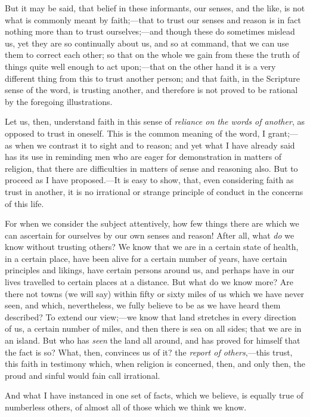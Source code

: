 But it may be said, that belief in these informants,
our senses, and the like, is not what is commonly meant
by faith;—that to trust our senses and reason is in
fact nothing more than to trust ourselves;—and
though these do sometimes mislead us, yet they are so
continually about us, and so at command, that we can use them to correct each other; so that on the whole we gain
from these the truth of things quite well enough to act
upon;—that on the other hand it is a very different
thing from this to trust another person; and that faith,
in the Scripture sense of the word, is trusting another,
and therefore is not proved to be rational by the
foregoing illustrations.

Let us, then, understand faith in this sense of \emph{reliance
on the words of another}, as opposed to trust in
oneself. This is the common meaning of the word, I
grant;—as when we contrast it to sight and to
reason; and yet what I have already said has its use in
reminding men who are eager for demonstration in matters
of religion, that there are difficulties in matters of
sense and reasoning also. But to proceed as I have
proposed.—It is easy to show, that, even considering
faith as trust in another, it is no irrational or strange
principle of conduct in the concerns of this life.

For when we consider the subject attentively, how few
things there are which we can ascertain for ourselves by
our own senses and reason! After all, what \emph{do} we
know without trusting others? We know that we are in a
certain state of health, in a certain place, have been
alive for a certain number of years, have certain
principles and likings, have certain persons around us,
and perhaps have in our lives travelled to certain places
at a distance. But what do we know more? Are there not
towns (we will say) within fifty or sixty miles of us
which we have never seen, and which, nevertheless, we
fully believe to be as we have heard them described? To
extend our view;—we know that land stretches in
every direction of us, a certain number of miles, and
then there is sea on all sides; that we are in an island.
But who has \emph{seen} the land all around, and has
proved for himself that the fact is so? What, then,
convinces us of it? the \emph{report of others},—this
trust, this faith in testimony which, when religion is
concerned, then, and only then, the proud and sinful
would fain call irrational.

And what I have instanced in one set of facts, which
we believe, is equally true of numberless others, of
almost all of those which we think we know.

